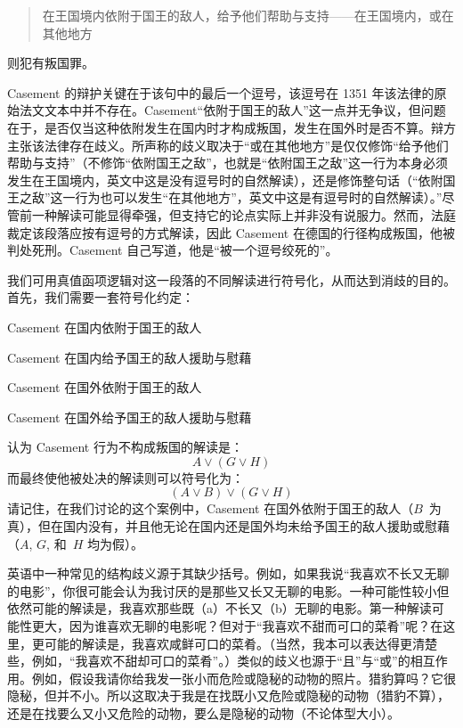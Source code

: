 \begin{quote}
	在王国境内依附于国王的敌人，给予他们帮助与支持——在王国境内，或在其他地方
\end{quote}

则犯有叛国罪。

Casement 的辩护关键在于该句中的最后一个逗号，该逗号在 1351 年该法律的原始法文文本中并不存在。Casement“依附于国王的敌人”这一点并无争议，但问题在于，是否仅当这种依附发生在国内时才构成叛国，发生在国外时是否不算。辩方主张该法律存在歧义。所声称的歧义取决于“或在其他地方”是仅仅修饰“给予他们帮助与支持”（不修饰“依附国王之敌”，也就是“依附国王之敌”这一行为本身必须发生在王国境内，英文中这是没有逗号时的自然解读），还是修饰整句话（“依附国王之敌”这一行为也可以发生“在其他地方”，英文中这是有逗号时的自然解读）。”尽管前一种解读可能显得牵强，但支持它的论点实际上并非没有说服力。然而，法庭裁定该段落应按有逗号的方式解读，因此 Casement 在德国的行径构成叛国，他被判处死刑。Casement 自己写道，他是“被一个逗号绞死的”。

我们可用真值函项逻辑对这一段落的不同解读进行符号化，从而达到消歧的目的。首先，我们需要一套符号化约定：

\begin{ekey}
	\item[A] Casement 在国内依附于国王的敌人
	\item[G] Casement 在国内给予国王的敌人援助与慰藉
	\item[B] Casement 在国外依附于国王的敌人
	\item[H] Casement 在国外给予国王的敌人援助与慰藉
\end{ekey}

认为 Casement 行为不构成叛国的解读是：
\[A \lor (G \lor H)\]
而最终使他被处决的解读则可以符号化为：
\[(A \lor B) \lor (G \lor H)\]
请记住，在我们讨论的这个案例中，Casement 在国外依附于国王的敌人（$B$~为真），但在国内没有，并且他无论在国内还是国外均未给予国王的敌人援助或慰藉（$A$, $G$, 和~$H$ 均为假）。

英语中一种常见的结构歧义源于其缺少括号。例如，如果我说“我喜欢不长又无聊的电影”，你很可能会认为我讨厌的是那些又长又无聊的电影。一种可能性较小但依然可能的解读是，我喜欢那些既（a）不长又（b）无聊的电影。第一种解读可能性更大，因为谁喜欢无聊的电影呢？但对于“我喜欢不甜而可口的菜肴”呢？在这里，更可能的解读是，我喜欢咸鲜可口的菜肴。（当然，我本可以表达得更清楚些，例如，“我喜欢不甜却可口的菜肴”。）类似的歧义也源于“且”与“或”的相互作用。例如，假设我请你给我发一张小而危险或隐秘的动物的照片。猎豹算吗？它很隐秘，但并不小。所以这取决于我是在找既小又危险或隐秘的动物（猎豹不算），还是在找要么又小又危险的动物，要么是隐秘的动物（不论体型大小）。

